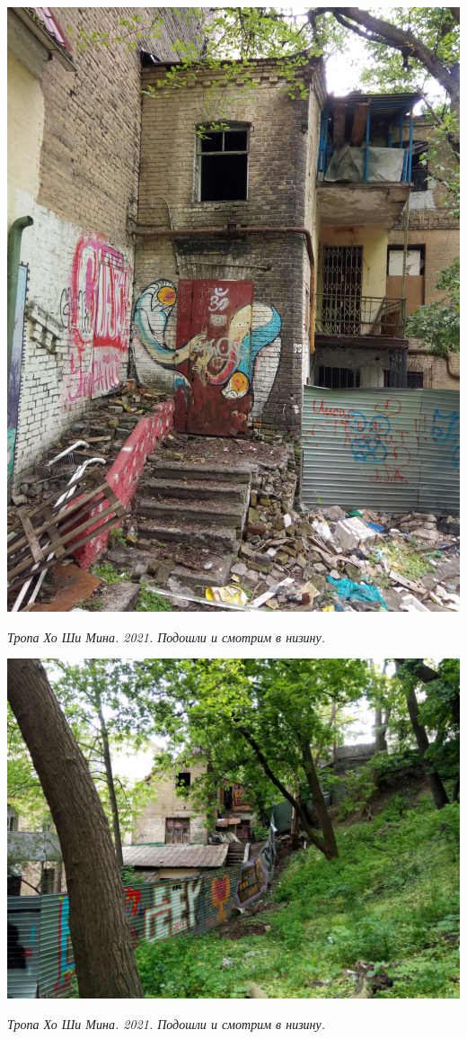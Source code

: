\begin{center}
\includegraphics[width=\linewidth]{rpix/IMG_20210601_135245.jpg}

\textit{Тропа Хо Ши Мина. 2021. Подошли и смотрим в низину.}
\end{center}



\begin{center}
\includegraphics[width=\linewidth]{rpix/IMG_20210601_135248.jpg}

\textit{Тропа Хо Ши Мина. 2021. Подошли и смотрим в низину.}
\end{center}




